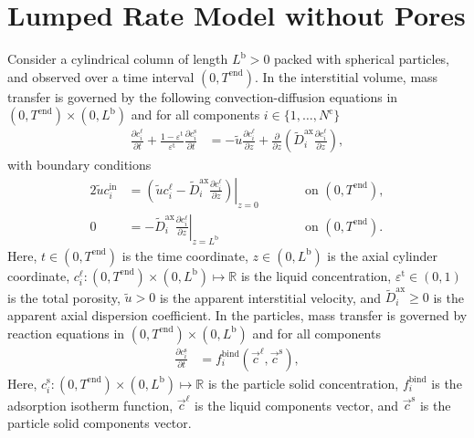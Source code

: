 \documentclass{article}
\begin{document}
\section*{Lumped Rate Model without Pores}
Consider a cylindrical column of length $L^{\mathrm{b}} > 0$ packed with spherical particles, and observed over a time interval $(0, T^{\mathrm{end}})$.
In the interstitial volume, mass transfer is governed by the following convection-diffusion equations in $(0, T^{\mathrm{end}})\times (0, L^{\mathrm{b}})$ and for all components $i\in\{1, \dots, N^{\mathrm{c}} \}$
\begin{align}
    \frac{\partial c^{\mathrm{\ell}}_{i}}{\partial t}
        + \frac{1 - \varepsilon^{\mathrm{t}}}{\varepsilon^{\mathrm{t}}} \frac{\partial c^{\mathrm{s}}_{i}}{\partial t}
    &= - \tilde{u} \frac{\partial c^{\mathrm{\ell}}_{i} }{\partial z}
        + \frac{\partial}{\partial z} \left( \tilde{D}^{\mathrm{ax}}_{i} \frac{\partial c^{\mathrm{\ell}}_{i}}{\partial z} \right),
\end{align}
with boundary conditions
\begin{alignat}{2}
    \tilde{u} c^{\mathrm{in}}_{i}
    &= \left.\left( \tilde{u} c^{\mathrm{\ell}}_{i} - \tilde{D}^{\mathrm{ax}}_{i} \frac{\partial c^{\mathrm{\ell}}_{i}}{\partial z}\right)\right|_{z=0}
    & & \qquad\text{on }(0, T^{\mathrm{end}}),
    \\
    0
    &= - \tilde{D}^{\mathrm{ax}}_{i} \left. \frac{\partial c^{\mathrm{\ell}}_{i}}{\partial z} \right|_{z=L^{\mathrm{b}}}
    & & \qquad\text{on }(0, T^{\mathrm{end}}).
\end{alignat}
Here, $t\in (0, T^{\mathrm{end}})$ is the time coordinate, $z\in (0, L^{\mathrm{b}})$ is the axial cylinder coordinate, $c^{\mathrm{\ell}}_{i}\colon (0, T^{\mathrm{end}})\times (0, L^{\mathrm{b}}) \mapsto \mathbb{R}$ is the liquid concentration, $\varepsilon^{\mathrm{t}}\in (0, 1)$ is the total porosity, $\tilde{u}> 0$ is the apparent interstitial velocity, and $\tilde{D}^{\mathrm{ax}}_{i}\geq 0$ is the apparent axial dispersion coefficient.
In the particles, mass transfer is governed by reaction equations in $(0, T^{\mathrm{end}}) \times (0, L^{\mathrm{b}})$ and for all components
\begin{align}
    \frac{\partial c^{\mathrm{s}}_{i}}{\partial t}
    &= f^{\mathrm{bind}}_{i}\left( \vec{c}^{\mathrm{\ell}}, \vec{c}^{\mathrm{s}} \right),
\end{align}
Here, $c^{\mathrm{s}}_{i}\colon (0, T^{\mathrm{end}}) \times (0, L^{\mathrm{b}}) \mapsto \mathbb{R}$ is the particle solid concentration, $f^{\mathrm{bind}}_{i}$ is the adsorption isotherm function, $\vec{c}^{\mathrm{\ell}}$ is the liquid components vector, and $\vec{c}^{\mathrm{s}}$ is the particle solid components vector.
\end{document}
